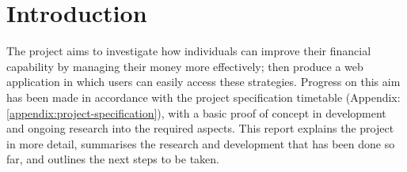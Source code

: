 \section{Introduction}

The project aims to investigate how individuals can improve their financial capability by managing their money more effectively; then produce a web application in which users can easily access these strategies. Progress on this aim has been made in accordance with the project specification timetable (Appendix: \ref{appendix:project-specification}), with a basic proof of concept in development and ongoing research into the required aspects. This report explains the project in more detail, summarises the research and development that has been done so far, and outlines the next steps to be taken.